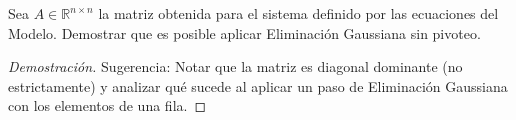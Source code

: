 \begin{lemma}
    Sea $A \in \mathbb{R}^{n \times n}$ la matriz obtenida para el sistema definido por las ecuaciones del Modelo. Demostrar que es posible aplicar Eliminación Gaussiana sin pivoteo.
\end{lemma}
\begin{proof}[Demostración]

   Sugerencia: Notar que la matriz es diagonal dominante (no estrictamente) y analizar qué sucede al aplicar un paso de Eliminación Gaussiana con los elementos de una fila.
\end{proof}
